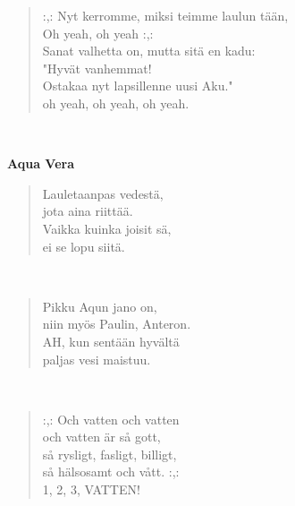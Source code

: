 \noindent\begin{minipage}{\linewidth}
\begin{verse}
	\hspace{0pt-\widthof{:,: }}:,: Nyt kerromme, miksi teimme laulun tään,\\
	Oh yeah, oh yeah :,:\\
	Sanat valhetta on, mutta sitä en kadu:\\
	"Hyvät vanhemmat!\\
	Ostakaa nyt lapsillenne uusi Aku."\\
	oh yeah, oh yeah, oh yeah.\\
	
\end{verse}
\end{minipage}\\[10pt]
%
%
\noindent\begin{minipage}{\linewidth}
\vspace{5pt}
\parbox[t]{0.85\linewidth}{\raggedright {\large\bf Aqua Vera}\\[6pt]}
\begin{verse}
	Lauletaanpas vedestä,\\
	jota aina riittää.\\
	Vaikka kuinka joisit sä,\\
	ei se lopu siitä.\\
\end{verse}
\end{minipage}\\[10pt]
\noindent\begin{minipage}{\linewidth}
\begin{verse}
	Pikku Aqun jano on,\\
	niin myös Paulin, Anteron.\\
	AH, kun sentään hyvältä\\
	paljas vesi maistuu.\\
\end{verse}
\end{minipage}\\[10pt]
\noindent\begin{minipage}{\linewidth}
\begin{verse}
	\hspace{0pt-\widthof{:,: }}:,: Och vatten och vatten\\
	och vatten är så gott,\\
	så rysligt, fasligt, billigt,\\
	så hälsosamt och vått. :,:\\
	1, 2, 3, VATTEN!\\
\end{verse}
\end{minipage}\\[10pt]
